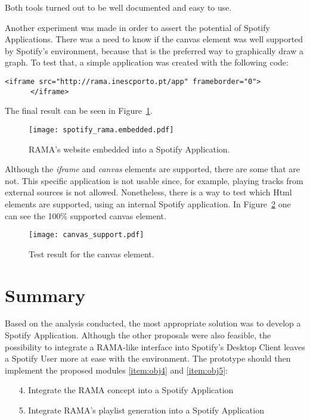     Both tools turned out to be well documented and easy to use.

    Another experiment was made in order to assert the potential of Spotify Applications.
    There was a need to know if the canvas element was well supported by Spotify's environment, because that is the preferred way to graphically draw a graph.
    To test that, a simple application was created with the following code:

    \begin{lstlisting}[caption={\emph{iframe} element that allows to embed RAMA's website into the application.}, style=htmlcssjs, captionpos=b]
      <iframe src="http://rama.inescporto.pt/app" frameborder="0">
      </iframe>\end{lstlisting}

    The final result can be seen in Figure~\ref{fig:rama_spotifyed}.
    \begin{figure}
      \begin{center}
        \texttt{[image: spotify\_rama.embedded.pdf]}
      \end{center}
      \caption{RAMA's website embedded into a Spotify Application.}
      \label{fig:rama_spotifyed}
    \end{figure}
    Although the \emph{iframe} and \emph{canvas} elements are supported, there are some that are not.
    This specific application is not usable since, for example, playing tracks from external sources is not allowed.
    Nonetheless, there is a way to test which Html elements are supported, using an internal Spotify application.
    In Figure~\ref{fig:canvas_support} one can see the 100\% supported canvas element.

    \begin{figure}[H]
       \begin{center}
         \texttt{[image: canvas\_support.pdf]}
       \end{center}
       \caption{Test result for the canvas element.}
       \label{fig:canvas_support}
     \end{figure}



\section{Summary}

  Based on the analysis conducted, the most appropriate solution was to develop a Spotify Application.
  Although the other proposals were also feasible, the possibility to integrate a RAMA-like interface into Spotify's Desktop Client leaves a Spotify User more at ease with the environment.
  The prototype should then implement the proposed modules \ref{item:obj4} and \ref{item:obj5}:

  \begin{itemize}
    \item[4.] Integrate the RAMA concept into a Spotify Application
    \item[5.] Integrate RAMA's playlist generation into a Spotify Application
  \end{itemize}
